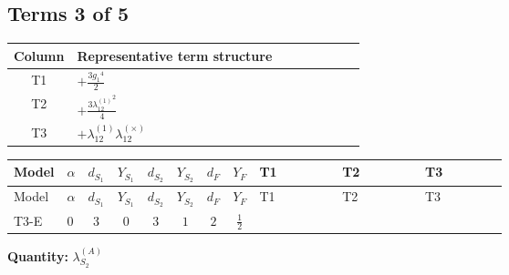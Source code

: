 \documentclass[8pt]{article}
\begin{document}
\begin{landscape}
\subsection*{Terms 3 of 5}
\begin{center}
\begin{tabular}{@{}c >{\raggedright\arraybackslash}p{0.82\linewidth}@{}}
\toprule
Column & Representative term structure \\
\midrule
T1 & \(\displaystyle +\frac{3 {g_1}^4}{2}\) \\
\midrule
T2 & \(\displaystyle +\frac{3 {\lambda_{12}^{(1)}}^2}{4}\) \\
\midrule
T3 & \(\displaystyle +{\lambda_{12}^{(1)}} {\lambda_{12}^{(\times)}}\) \\
\midrule
\bottomrule
\end{tabular}
\end{center}
\smallskip
\tiny
\begin{longtable}{@{}llcccccc >{\raggedright\arraybackslash}p{0.21\linewidth} >{\raggedright\arraybackslash}p{0.21\linewidth} >{\raggedright\arraybackslash}p{0.21\linewidth}@{}}
\toprule
Model & $\alpha$ & $d_{S_1}$ & $Y_{S_1}$ & $d_{S_2}$ & $Y_{S_2}$ & $d_F$ & $Y_F$ & T1 & T2 & T3 \\
\midrule
\endfirsthead
\toprule
Model & $\alpha$ & $d_{S_1}$ & $Y_{S_1}$ & $d_{S_2}$ & $Y_{S_2}$ & $d_F$ & $Y_F$ & T1 & T2 & T3 \\
\midrule
\endhead
T3-E & $0$ & $3$ & $0$ & $3$ & $1$ & $2$ & $\frac{1}{2}$ & \scriptsize\adjustbox{max width=\linewidth}{$\begin{gathered} +\frac{3 {g_1}^4}{2}\end{gathered}$} & \scriptsize\adjustbox{max width=\linewidth}{$\begin{gathered} +\frac{3 {\lambda_{12}^{(1)}}^2}{4}\end{gathered}$} & \scriptsize\adjustbox{max width=\linewidth}{$\begin{gathered} +{\lambda_{12}^{(1)}} {\lambda_{12}^{(\times)}}\end{gathered}$} \\
\midrule
\bottomrule
\end{longtable}
\clearpage
\noindent\textbf{Quantity: }$\lambda_{S_2}^{(A)}$\par\smallskip

\end{landscape}
\end{document}
